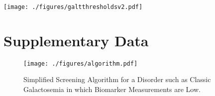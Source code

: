 \documentclass[review]{elsarticle}
\begin{document}
\begin{center}
\texttt{[image: ./figures/galtthresholdsv2.pdf]}
\end{center}

\section*{Supplementary Data}
\label{sec:org71e2b0a}

\beginsupplement

\begin{figure}[htbp]
\centering
\texttt{[image: ./figures/algorithm.pdf]}
\caption{\label{fig:org82877b6}Simplified Screening Algorithm for a Disorder such as Classic Galactosemia in which Biomarker Measurements are Low.}
\end{figure}
\end{document}
